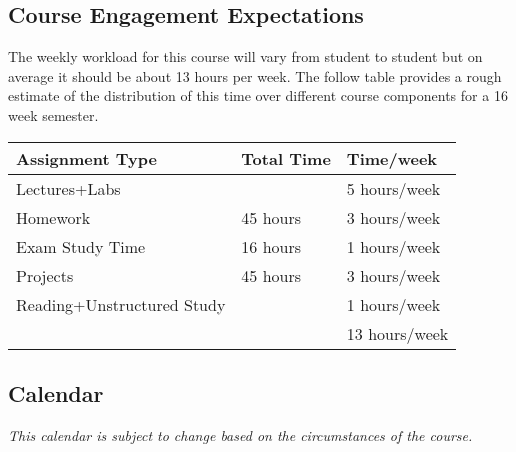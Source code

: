 \documentclass[10pt]{article}
\begin{document}
\subsection{Course Engagement Expectations}

The weekly workload for this course will vary from student to student but on average it should be about 13 hours per week.  The follow table provides a rough estimate of the distribution of this time over different course components for a 16 week semester.
\begin{center}
\begin{tabular}{lll}
Assignment Type & Total Time & Time/week \\ \toprule
Lectures+Labs &      & 5 hours/week \\
Homework & 45 hours        & 3 hours/week \\
Exam Study Time & 16 hours  & 1 hours/week \\
Projects & 45 hours        & 3 hours/week \\
Reading+Unstructured Study & & 1 hours/week \\
\bottomrule
& & 13 hours/week
\end{tabular}
\end{center}


\subsection{Calendar}

\textit{This calendar is subject to change based on the circumstances of the course.}
\end{document}
